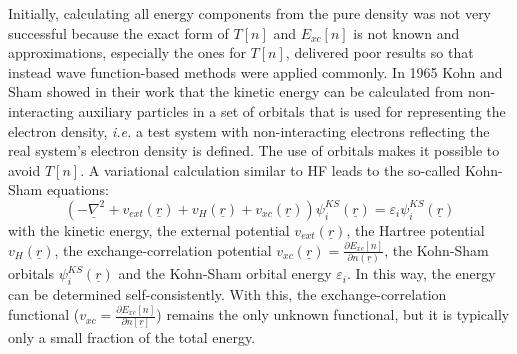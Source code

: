\documentclass[11pt,DIV=13,BCOR=5mm,a4paper,headinclude]{scrbook}
\renewcommand{\vec}[1]{\underline{#1}}
\begin{document}
Initially, calculating all energy components from the pure density was not very successful because the exact form of $T[n]$ and $E_{xc}[n]$ is not known and approximations, especially the ones for $T[n]$, delivered poor results so that instead wave function-based methods were applied commonly.
In 1965 Kohn and Sham showed in their work\cite{Kohn-Sham1965} that the kinetic energy can be calculated from non-interacting auxiliary particles in a set of orbitals that is used for representing the electron density, \textit{i.e.} a test system with non-interacting electrons reflecting the real system's electron density is defined.
The use of orbitals makes it possible to avoid $T[n]$\cite{Gross03}. %
A variational calculation similar to HF leads to the so-called Kohn-Sham equations:
\begin{equation}\label{eq:KS}
 \left(-\vec{\nabla}^2 + v_{ext}(\vec{r}) + v_{H}(\vec{r}) + v_{xc}(\vec{r}) \right)\psi^{KS}_i(\vec{r}) = \varepsilon_i\psi^{KS}_i(\vec{r})
\end{equation}
with the kinetic energy, the external potential $v_{ext}(\vec{r})$, the Hartree potential $v_{H}(\vec{r})$, the exchange-correlation potential $v_{xc}(\vec{r})=\frac{\partial E_{xc}[n]}{\partial n(\vec{r})}$, the Kohn-Sham orbitals $\psi^{KS}_i(\vec{r})$ and the Kohn-Sham orbital energy $\varepsilon_i$.
In this way, the energy can be determined self-consistently.
With this, the exchange-correlation functional ($v_{xc}=\frac{\partial E_{xc}[n]}{\partial n[\vec{r}]}$) remains the only unknown functional, but it is typically only a small fraction of the total energy.
\end{document}
